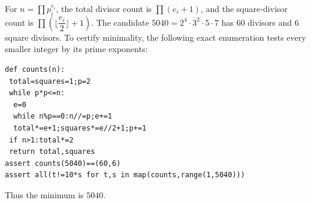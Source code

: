 For $ n=\prod p_i^{e_i}$, the total divisor count is $\prod(e_i+1)$, and the square-divisor count is $\prod(\lfloor\dfrac{e_i}{2}\rfloor+1)$. The candidate $ 5040=2^4\cdot3^2\cdot5\cdot7 $ has 60 divisors and 6 square divisors. To certify minimality, the following exact enumeration tests every smaller integer by its prime exponents:
\begin{verbatim}
def counts(n):
 total=squares=1;p=2
 while p*p<=n:
  e=0
  while n%p==0:n//=p;e+=1
  total*=e+1;squares*=e//2+1;p+=1
 if n>1:total*=2
 return total,squares
assert counts(5040)==(60,6)
assert all(t!=10*s for t,s in map(counts,range(1,5040)))
\end{verbatim}
Thus the minimum is $\boxed{5040}$.

